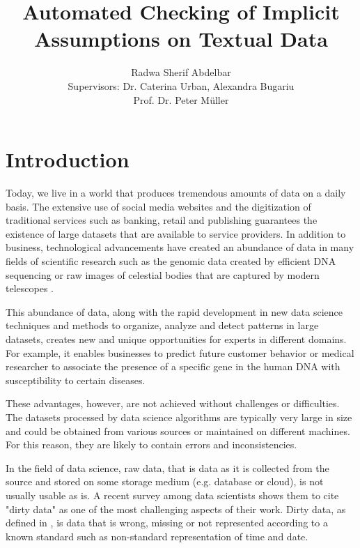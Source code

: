 \documentclass[]{report}
\title{Automated Checking of Implicit Assumptions on Textual Data}
\author{Radwa Sherif Abdelbar \\
	 Supervisors: Dr. Caterina Urban, Alexandra Bugariu \\ Prof. Dr. Peter M{\"u}ller}
\begin{document}
\maketitle



\begin{abstract}

\end{abstract}

\chapter{Introduction}

Today, we live in a world that produces tremendous amounts of data on a daily basis. The extensive use of social media websites and the digitization of traditional services such as banking, retail and publishing guarantees the existence of large datasets that are available to service providers. In addition to business, technological advancements have created an abundance of data in many fields of scientific research such as the genomic data created by efficient DNA sequencing or raw images of celestial bodies that are captured by modern telescopes \cite{blei2017science}. 

This abundance of data, along with the rapid development in new data science techniques and methods to organize, analyze and detect patterns in large datasets, creates new and unique opportunities for experts in different domains. For example, it enables businesses to predict future customer behavior or medical researcher to associate the presence of a specific gene in the human DNA with susceptibility to certain diseases. 

These advantages, however, are not achieved without challenges or difficulties. The datasets processed by data science algorithms are typically very large in size and could be obtained from various sources or maintained on different machines. For this reason, they are likely to contain errors and inconsistencies. 

In the field of data science, raw data, that is data as it is collected from the source and stored on some storage medium (e.g. database or cloud), is not usually usable as is. A recent survey among data scientists \cite{kaggle} shows them to cite "dirty data" as one of the most challenging aspects of their work. Dirty data, as defined in \cite{dirty-data}, is data that is wrong, missing or not represented according to a known standard such as non-standard representation of time and date.
\end{document}
